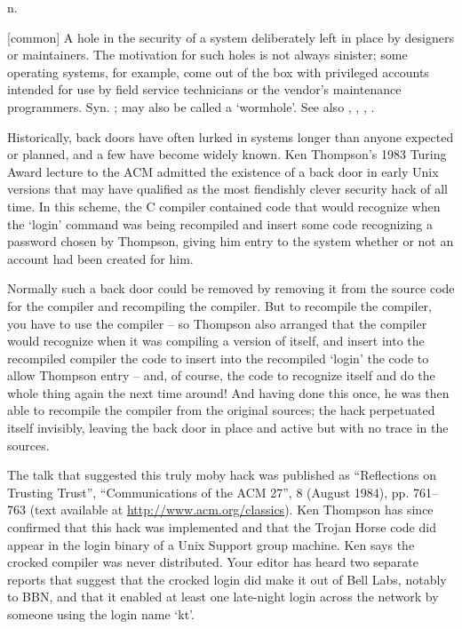  n.

[common] A hole in the security of a system deliberately left in place by
designers or maintainers. The motivation for such holes is not always sinister;
some operating systems, for example, come out of the box with privileged
accounts intended for use by field service technicians or the vendor's
maintenance programmers. Syn. ; may also be called a
`wormhole'. See also , ,
, .

Historically, back doors have often lurked in systems longer than anyone
expected or planned, and a few have become widely known. Ken Thompson's 1983
Turing Award lecture to the ACM admitted the existence of a back door in early
Unix versions that may have qualified as the most fiendishly clever security
hack of all time. In this scheme, the C compiler contained code that would
recognize when the `login' command was being recompiled and insert some code
recognizing a password chosen by Thompson, giving him entry to the system
whether or not an account had been created for him.

Normally such a back door could be removed by removing it from the source code
for the compiler and recompiling the compiler. But to recompile the compiler,
you have to use the compiler -- so Thompson also arranged that the compiler
would recognize when it was compiling a version of itself, and insert into the
recompiled compiler the code to insert into the recompiled `login' the code to
allow Thompson entry -- and, of course, the code to recognize itself and do the
whole thing again the next time around! And having done this once, he was then
able to recompile the compiler from the original sources; the hack perpetuated
itself invisibly, leaving the back door in place and active but with no trace in
the sources.

The talk that suggested this truly moby hack was published as ``Reflections on
Trusting Trust'', ``Communications of the ACM 27'', 8 (August 1984), pp.
761--763 (text available at \url{http://www.acm.org/classics}). Ken Thompson has
since confirmed that this hack was implemented and that the Trojan Horse code
did appear in the login binary of a Unix Support group machine. Ken says the
crocked compiler was never distributed. Your editor has heard two separate
reports that suggest that the crocked login did make it out of Bell Labs,
notably to BBN, and that it enabled at least one late-night login across the
network by someone using the login name `kt'.

